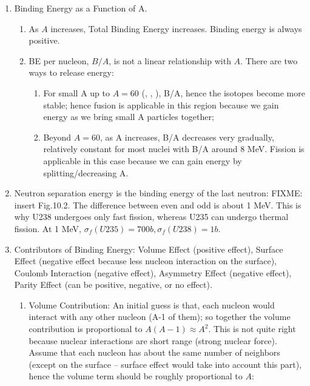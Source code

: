 \documentclass{school-22.101-notes}
\begin{document}
\begin{enumerate}
\item Binding Energy as a Function of A. 
\begin{enumerate}
\item As $A$ increases, Total Binding Energy increases. Binding energy is always positive. 
\item BE per nucleon, $B/A$, is not a linear relationship with $A$.  There are two ways to release energy: 
    \begin{enumerate}
    \item For small A up to $A = 60$ (, , ), B/A, hence the isotopes become more stable; hence fusion is applicable in this region because we gain energy as we bring small A particles together; 
    \item Beyond $A = 60$, as A increases, B/A decreases very gradually, relatively constant for most nuclei with B/A around 8 MeV. Fission is applicable in this case because we can gain energy by splitting/decreasing A. 
    \end{enumerate}  
\end{enumerate}


\item Neutron separation energy is the binding energy of the last neutron: 
  FIXME: insert Fig.10.2. The difference between even and odd is about 1 MeV. This is why U238 undergoes only fast fission, whereas U235 can undergo thermal fission. At 1 MeV, $\sigma_f (U235) = 700b, \sigma_f (U238) = 1b$. 


\item Contributors of Binding Energy: Volume Effect (positive effect), Surface Effect (negative effect because less nucleon interaction on the surface), Coulomb Interaction (negative effect), Asymmetry Effect (negative effect), Parity Effect (can be positive, negative, or no effect). 
\begin{enumerate}
    \item Volume Contribution: An initial guess is that, each nucleon would interact with any other nucleon (A-1 of them); so together the volume contribution is proportional to $A(A-1) \approx A^2$. This is not quite right because nuclear interactions are short range (strong nuclear force). Assume that each nucleon has about the same number of neighbors (except on the surface -- surface effect would take into account this part), hence the volume term should be roughly proportional to $A$:


\end{enumerate}
\end{enumerate}
\end{document}
